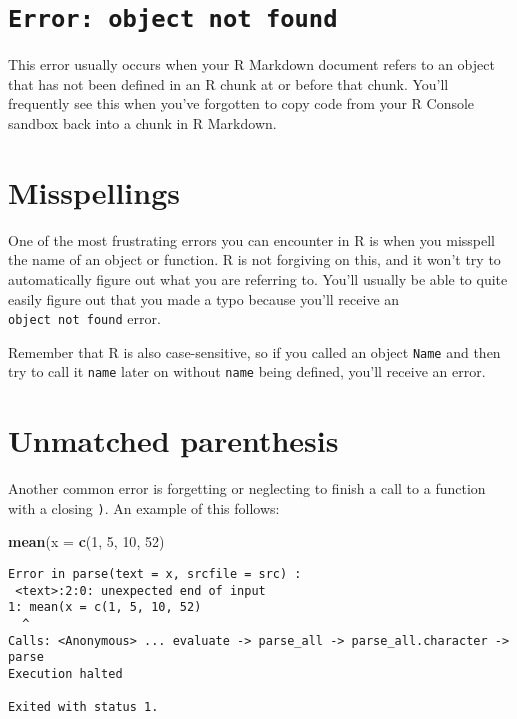 \documentclass[]{tufte-book}
\newenvironment{Shaded}{\begin{snugshade}}{\end{snugshade}}
\newcommand{\DataTypeTok}[1]{\textcolor[rgb]{0.13,0.29,0.53}{#1}}
\newcommand{\DecValTok}[1]{\textcolor[rgb]{0.00,0.00,0.81}{#1}}
\newcommand{\KeywordTok}[1]{\textcolor[rgb]{0.13,0.29,0.53}{\textbf{#1}}}
\newcommand{\NormalTok}[1]{#1}
\begin{document}
\hypertarget{error-object-not-found}{%
\section{\texorpdfstring{\texttt{Error:\ object\ not\ found}}{Error: object not found}}\label{error-object-not-found}}

This error usually occurs when your R Markdown document refers to an object that has not been defined in an R chunk at or before that chunk. You'll frequently see this when you've forgotten to copy code from your R Console sandbox back into a chunk in R Markdown.

\hypertarget{misspellings}{%
\section{Misspellings}\label{misspellings}}

One of the most frustrating errors you can encounter in R is when you misspell the name of an object or function. R is not forgiving on this, and it won't try to automatically figure out what you are referring to. You'll usually be able to quite easily figure out that you made a typo because you'll receive an \texttt{object\ not\ found} error.

Remember that R is also case-sensitive, so if you called an object \texttt{Name} and then try to call it \texttt{name} later on without \texttt{name} being defined, you'll receive an error.

\hypertarget{unmatched-parenthesis}{%
\section{Unmatched parenthesis}\label{unmatched-parenthesis}}

Another common error is forgetting or neglecting to finish a call to a function with a closing \texttt{)}. An example of this follows:

\begin{Shaded}
\begin{Highlighting}[]
\KeywordTok{mean}\NormalTok{(}\DataTypeTok{x =} \KeywordTok{c}\NormalTok{(}\DecValTok{1}\NormalTok{, }\DecValTok{5}\NormalTok{, }\DecValTok{10}\NormalTok{, }\DecValTok{52}\NormalTok{)}
\end{Highlighting}
\end{Shaded}

\begin{verbatim}
Error in parse(text = x, srcfile = src) :
 <text>:2:0: unexpected end of input
1: mean(x = c(1, 5, 10, 52)
  ^
Calls: <Anonymous> ... evaluate -> parse_all -> parse_all.character -> parse
Execution halted

Exited with status 1.
\end{verbatim}
\end{document}
